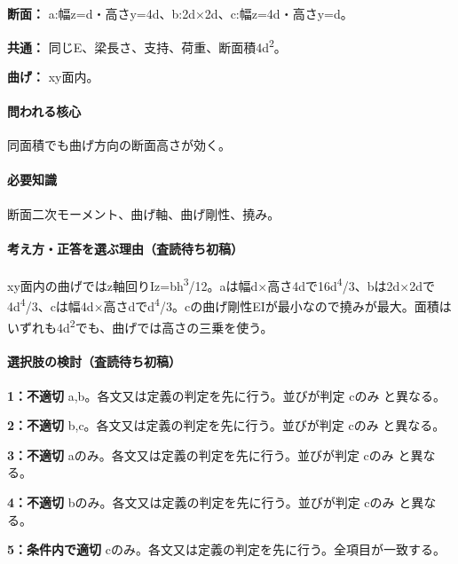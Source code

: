 \noindent\textbf{断面：} a:幅z=\allowbreak{}d・高さy=\allowbreak{}4d、b:2d×2d、c:幅z=\allowbreak{}4d・高さy=\allowbreak{}d。\par

\noindent\textbf{共通：} 同じE、梁長さ、支持、荷重、断面積4d\textsuperscript{2}。\par

\noindent\textbf{曲げ：} xy面内。\par

\paragraph{問われる核心} 同面積でも曲げ方向の断面高さが効く。

\paragraph{必要知識} 断面二次モーメント、曲げ軸、曲げ剛性、撓み。

\paragraph{考え方・正答を選ぶ理由（査読待ち初稿）} xy面内の曲げではz軸回りIz=\allowbreak{}bh\textsuperscript{3}/12。aは幅d×高さ4dで16d\textsuperscript{4}/3、bは2d×2dで4d\textsuperscript{4}/3、cは幅4d×高さdでd\textsuperscript{4}/3。cの曲げ剛性EIが最小なので撓みが最大。面積はいずれも4d\textsuperscript{2}でも、曲げでは高さの三乗を使う。

\paragraph{選択肢の検討（査読待ち初稿）}\mbox{}\par

\noindent\textbf{1：不適切} a,b。各文又は定義の判定を先に行う。並びが判定 cのみ と異なる。\par

\noindent\textbf{2：不適切} b,c。各文又は定義の判定を先に行う。並びが判定 cのみ と異なる。\par

\noindent\textbf{3：不適切} aのみ。各文又は定義の判定を先に行う。並びが判定 cのみ と異なる。\par

\noindent\textbf{4：不適切} bのみ。各文又は定義の判定を先に行う。並びが判定 cのみ と異なる。\par

\noindent\textbf{5：条件内で適切} cのみ。各文又は定義の判定を先に行う。全項目が一致する。\par

